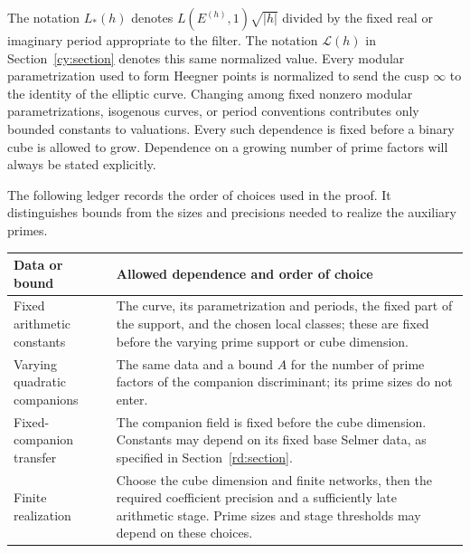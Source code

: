 The notation $L_*(h)$ denotes $L(E^{(h)},1)\sqrt{|h|}$ divided by the
fixed real or imaginary period appropriate to the filter.
The notation $\mathcal L(h)$ in Section~\ref{cy:section} denotes
this same normalized value.
Every modular parametrization used to form Heegner points is normalized
to send the cusp $\infty$ to the identity of the elliptic curve.
Changing among fixed nonzero modular parametrizations, isogenous curves,
or period conventions contributes only bounded constants to valuations.
Every such dependence is fixed before a binary cube is allowed to grow.
Dependence on a growing number of prime factors will always be stated
explicitly.

The following ledger records the order of choices used in the proof.
It distinguishes bounds from the sizes and precisions needed to realize
the auxiliary primes.
\begin{center}
\small
\begin{tabular}{@{}>{\raggedright\arraybackslash}p{}>{\raggedright\arraybackslash}p{}@{}}
\toprule
Data or bound & Allowed dependence and order of choice \\
\midrule
Fixed arithmetic constants & The curve, its parametrization and periods,
the fixed part of the support, and the chosen local classes; these are fixed before
the varying prime support or cube dimension. \\
Varying quadratic companions & The same data and a bound $A$ for
the number of prime factors of the companion discriminant; its prime
sizes do not enter. \\
Fixed-companion transfer & The companion field is fixed before the
cube dimension. Constants may depend on its fixed base Selmer data,
as specified in Section~\ref{rd:section}. \\
Finite realization & Choose the cube dimension and finite networks,
then the required coefficient precision and a sufficiently late
arithmetic stage. Prime sizes and stage thresholds may depend on
these choices. \\
\bottomrule
\end{tabular}
\end{center}

